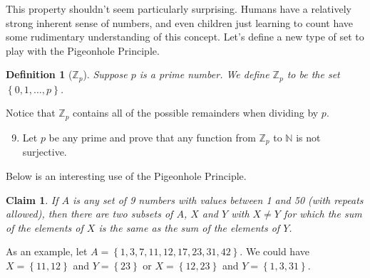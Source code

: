 \documentclass[12 pt]{article}
\newcommand{\Z}{\mathbb{Z}}
\newcommand{\N}{\mathbb{N}}
\newcommand{\set}[1]{\left\{#1\right\}}
\theoremstyle{definition}
\theoremstyle{plain}
\theoremstyle{mytheorem}
\theoremstyle{myexample}
\newtheorem{claim}{Claim}
\theoremstyle{mydefinition}
\newtheorem{definition}{Definition}
\begin{document}
This property shouldn't seem particularly surprising.  Humans have a relatively strong inherent sense of numbers, and even children just learning to count have some rudimentary understanding of this concept.  Let's define a new type of set to play with the Pigeonhole Principle.

\begin{definition}[$\Z_p$]  Suppose $p$ is a prime number.  We define $\Z_p$ to be the set $\set{0,1,\ldots,p}$.
\end{definition}

Notice that $\Z_p$ contains all of the possible remainders when dividing by $p$.

\begin{enumerate}\setcounter{enumi}{8}
\item Let $p$ be any prime and prove that any function from $\Z_p$ to $\N$ is not surjective.
\end{enumerate}

\vspace{2in}

\noindent Below is an interesting use of the Pigeonhole Principle.

\begin{claim}  If $A$ is any set of 9 numbers with values between 1 and 50 (with repeats allowed), then there are two subsets of $A$, $X$ and $Y$ with $X\neq Y$ for which the sum of the elements of $X$ is the same as the sum of the elements of $Y$. 
\end{claim}

As an example, let $A=\set{1,3,7,11,12,17,23,31,42}$.  We could have $X = \set{11,12}$ and $Y=\set{23}$ or $X=\set{12,23}$ and $Y=\set{1,3,31}$.
\end{document}
